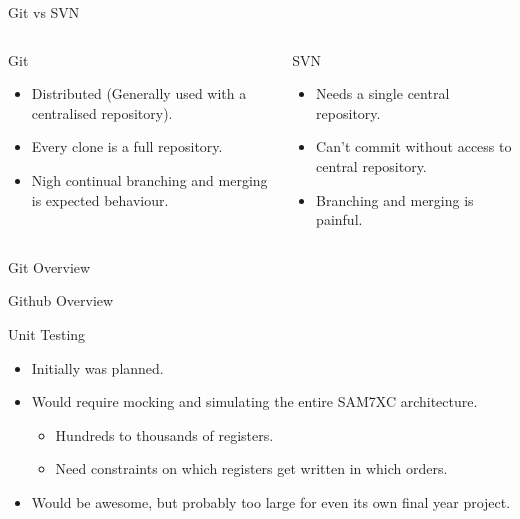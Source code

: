 \documentclass[xcolor=dvipsnames]{beamer}
\begin{document}
    \begin{frame}{Git vs SVN}
      \begin{columns}
          \begin{block}{Git}
            \begin{itemize}
              \item Distributed (Generally used with a centralised repository).
              \item Every clone is a full repository.
              \item Nigh continual branching and merging is expected behaviour.
            \end{itemize}
          \end{block}

          \begin{block}{SVN}
            \begin{itemize}
              \item Needs a single central repository.
              \item Can't commit without access to central repository.
              \item Branching and merging is painful.
            \end{itemize}
          \end{block}
      \end{columns}
    \end{frame}

    \begin{frame}{Git Overview}
    \end{frame}

    \begin{frame}{Github Overview}
    \end{frame}

    \begin{frame}{Unit Testing}
      \begin{itemize}
        \item Initially was planned.
        \vspace{0.5\baselineskip}
        \item Would require mocking and simulating the entire SAM7XC architecture.
        \begin{itemize}
          \item Hundreds to thousands of registers.
          \item Need constraints on which registers get written in which orders.
        \end{itemize}
        \vspace{0.5\baselineskip}
        \item Would be awesome, but probably too large for even its own final year project.
      \end{itemize}
    \end{frame}
\end{document}
